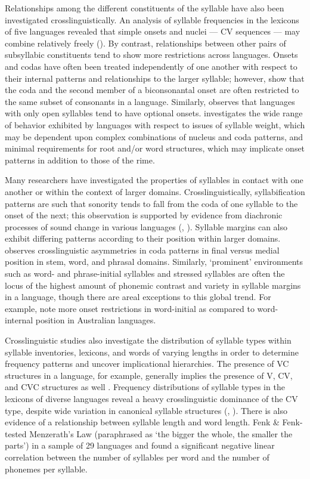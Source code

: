   Relationships among the different constituents of the syllable have also been investigated crosslinguistically. An analysis of syllable frequencies in the lexicons of five languages revealed that simple onsets and nuclei — CV sequences — may combine relatively freely (\citealt{MaddiesonPrecoda1992}). By contrast, relationships between other pairs of subsyllabic constituents tend to show more restrictions across languages. Onsets and codas have often been treated independently of one another with respect to their internal patterns and relationships to the larger syllable; however, \citet{DavisBaertsch2011} show that the coda and the second member of a biconsonantal onset are often restricted to the same subset of consonants in a language. Similarly, \citet{Blevins2006} observes that languages with only open syllables tend to have optional onsets. \citet{Gordon2006} investigates the wide range of behavior exhibited by languages with respect to issues of syllable weight, which may be dependent upon complex combinations of nucleus and coda patterns, and minimal requirements for root and/or word structures, which may implicate onset patterns in addition to those of the rime.

  Many researchers have investigated the properties of syllables in contact with one another or within the context of larger domains. Crosslinguistically, syllabification patterns are such that sonority tends to fall from the coda of one syllable to the onset of the next; this observation is supported by evidence from diachronic processes of sound change in various languages (\citealt{Hooper1976}, \citealt{MurrayVennemann1983}). Syllable margins can also exhibit differing patterns according to their position within larger domains. \citet{Côté2011} observes crosslinguistic asymmetries in coda patterns in final versus medial position in stem, word, and phrasal domains. Similarly, ‘prominent’ environments such as word- and phrase-initial syllables and stressed syllables are often the locus of the highest amount of phonemic contrast and variety in syllable margins in a language, though there are areal exceptions to this global trend. For example, \citet{GasserBowern2014} note more onset restrictions in word-initial as compared to word-internal position in Australian languages.

  Crosslinguistic studies also investigate the distribution of syllable types within syllable inventories, lexicons, and words of varying lengths in order to determine frequency patterns and uncover implicational hierarchies. The presence of VC structures in a language, for example, generally implies the presence of V, CV, and CVC structures as well \citep{Blevins1995}. Frequency distributions of syllable types in the lexicons of diverse languages reveal a heavy crosslinguistic dominance of the CV type, despite wide variation in canonical syllable structures (\citealt{Rousset2004}, \citealt{ValléeEtAl2009}). There is also evidence of a relationship between syllable length and word length. Fenk \& Fenk-\citet{Oczlon1993} tested Menzerath’s Law (paraphrased as ‘the bigger the whole, the smaller the parts’) in a sample of 29 languages and found a significant negative linear correlation between the number of syllables per word and the number of phonemes per syllable.


